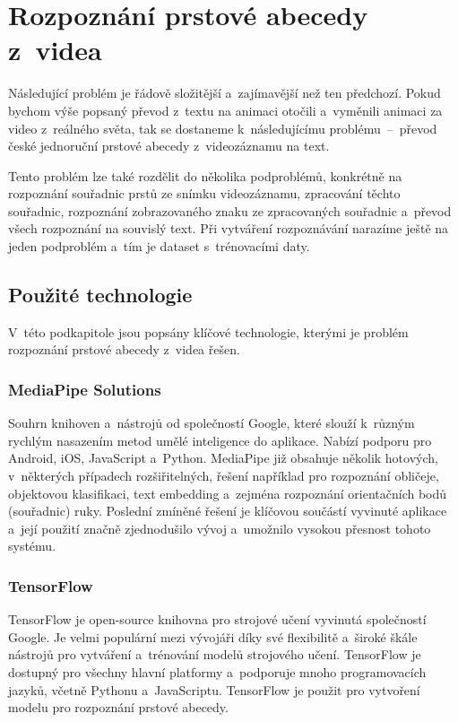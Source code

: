 \documentclass[
  master,
  program=ainfvs,
  biblatex,
  figures=true,
  tables=false,
  sourcecodes=true,
  glossaries,
  index
]{kidiplom}
\begin{document}
\clearpage



\section{Rozpoznání prstové abecedy z~videa}
    Následující problém je řádově složitější a~zajímavější než ten předchozí. Pokud bychom výše popsaný převod z~textu na animaci otočili a~vyměnili animaci za video z~reálného světa, tak se dostaneme k~následujícímu problému~--~převod české jednoruční prstové abecedy z~videozáznamu na text.

    Tento problém lze také rozdělit do několika podproblémů, konkrétně na rozpoznání souřadnic prstů ze snímku videozáznamu, zpracování těchto souřadnic, rozpoznání zobrazovaného znaku ze zpracovaných souřadnic a~převod všech rozpoznání na souvislý text. Při vytváření rozpoznávání narazíme ještě na jeden podproblém a~tím je dataset s~trénovacími daty.
        
    \subsection{Použité technologie}
        V~této podkapitole jsou popsány klíčové technologie, kterými je problém rozpoznání prstové abecedy z~videa řešen.
        
        \subsubsection{MediaPipe Solutions}
                Souhrn knihoven a~nástrojů od společností Google, které slouží k~různým rychlým nasazením metod umělé inteligence do aplikace. Nabízí podporu pro Android, iOS, JavaScript a~Python. MediaPipe již obsahuje několik hotových, v~některých případech rozšiřitelných, řešení například pro rozpoznání obličeje, objektovou klasifikaci, text embedding a~zejména rozpoznání orientačních bodů (souřadnic) ruky. Poslední zmíněné řešení je klíčovou součástí vyvinuté aplikace a~její použití značně zjednodušilo vývoj a~umožnilo vysokou přesnost tohoto systému. \cite{mediapipe}
                
        \subsubsection{TensorFlow}
                TensorFlow je open-source knihovna pro strojové učení vyvinutá společností Google. Je velmi populární mezi vývojáři díky své flexibilitě a~široké škále nástrojů pro vytváření a~trénování modelů strojového učení. TensorFlow je dostupný pro všechny hlavní platformy a~podporuje mnoho programovacích jazyků, včetně Pythonu a~JavaScriptu. TensorFlow je použit pro vytvoření modelu pro rozpoznání prstové abecedy. \cite{tensorflow}
                
\end{document}
